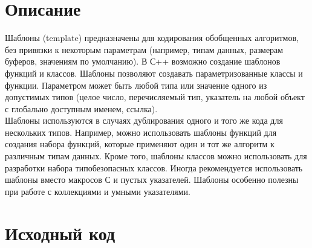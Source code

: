 \section{Описание}

Шаблоны (template) предназначены для кодирования обобщенных алгоритмов, без привязки к некоторым параметрам (например, типам данных, размерам буферов, значениям по умолчанию). В С++ возможно создание шаблонов функций и классов. Шаблоны позволяют создавать параметризованные классы и функции. Параметром может быть любой типа или значение одного из допустимых типов (целое число, перечисляемый тип, указатель на любой объект с глобально доступным именем, ссылка). \\
Шаблоны используются в случаях дублирования одного и того же кода для нескольких типов. Например, можно использовать шаблоны функций для создания набора функций, которые применяют один и тот же алгоритм к различным типам данных. Кроме того, шаблоны классов можно использовать для разработки набора типобезопасных классов. Иногда рекомендуется использовать шаблоны вместо макросов С и пустых указателей. Шаблоны особенно полезны при работе с коллекциями и умными указателями.\\


\section{Исходный код}

